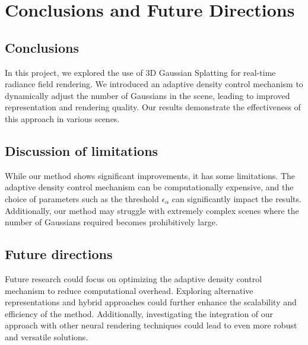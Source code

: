 \documentclass[12pt]{report}
\begin{document}
\chapter{Conclusions and Future Directions}

\section{Conclusions}
In this project, we explored the use of 3D Gaussian Splatting for real-time radiance field rendering. We introduced an adaptive density control mechanism to dynamically adjust the number of Gaussians in the scene, leading to improved representation and rendering quality. Our results demonstrate the effectiveness of this approach in various scenes.

\section{Discussion of limitations}
While our method shows significant improvements, it has some limitations. The adaptive density control mechanism can be computationally expensive, and the choice of parameters such as the threshold $\epsilon_\alpha$ can significantly impact the results. Additionally, our method may struggle with extremely complex scenes where the number of Gaussians required becomes prohibitively large.

\section{Future directions}
Future research could focus on optimizing the adaptive density control mechanism to reduce computational overhead. Exploring alternative representations and hybrid approaches could further enhance the scalability and efficiency of the method. Additionally, investigating the integration of our approach with other neural rendering techniques could lead to even more robust and versatile solutions.
\end{document}
